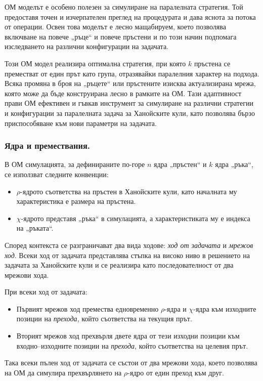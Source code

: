 ОМ моделът е особено полезен за симулиране на паралелната стратегия. Той предоставя точен и изчерпателен преглед на процедурата и дава яснота за потока от операции. Освен това моделът е лесно мащабируем, което позволява включване на повече „ръце“ и повече пръстени и по този начин подпомага изследването на различни конфигурации на задачата.

Този ОМ модел реализира оптимална стратегия, при която \(k\) пръстена се преместват от един прът като група, отразявайки паралелния характер на подхода. Всяка промяна в броя на „ръцете“ или пръстените изисква актуализирана мрежа, която може да бъде конструирана лесно в рамките на ОМ. Тази адаптивност прави ОМ ефективен и гъвкав инструмент за симулиране на различни стратегии и конфигурации за паралелната задача за Ханойските кули, като позволява бързо приспособяване към нови параметри на задачата.


\subsubsection*{Ядра и премествания.}

В ОМ симулацията, за дефинираните по-горе \(n\) ядра „пръстен“ и \(k\) ядра „ръка“, се използват следните конвенции:
%
\begin{itemize}
	\item \(\rho\)-ядрото съответства на пръстен в Ханойските кули, като началната му характеристика е размера на пръстена.
	\item \(\chi\)-ядрото представя „ръка“ в симулацията, а характеристиката му е индекса на „ръката“.
\end{itemize}

Според контекста се разграничават два вида ходове: \emph{ход от задачата} и \emph{мрежов ход}. Всеки ход от задачата представлява стъпка на високо ниво в решението на задачата за Ханойските кули и се реализира като последователност от два мрежови хода.

При всеки ход от задачата:
\begin{itemize}
	\item Първият мрежов ход премества едновременно \(\rho\)-ядра и \(\chi\)-ядра към изходните позиции на \emph{прехода}, който съответства на текущия прът.
	\item Вторият мрежов ход прехвърля двете ядра от тези изходни позиции към входно--изходните позиции на \emph{прехода}, който съответства на целевия прът.
\end{itemize}

Така всеки пълен ход от задачата се състои от два мрежови хода, което позволява на ОМ да симулира прехвърлянето на \(\rho\)-ядро от един преход към друг.

